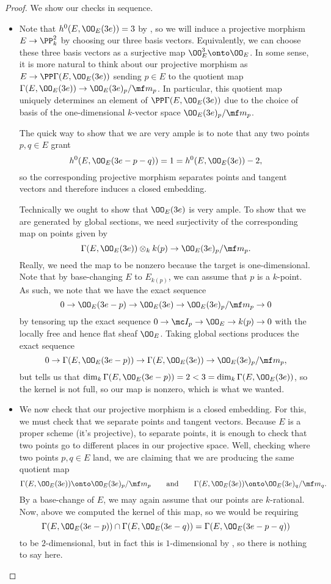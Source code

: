 \documentclass[../notes.tex]{subfiles}
\begin{document}
\begin{proof}
	We show our checks in sequence.
	\begin{itemize}
		\item Note that $h^0(E,\OO_E(3e))=3$ by , so we will induce a projective morphism $E\to\PP^2_k$ by choosing our three basis vectors. Equivalently, we can choose these three basis vectors as a surjective map $\OO_E^3\onto\OO_E$. In some sense, it is more natural to think about our projective morphism as $E\to\PP\Gamma(E,\OO_E(3e))$ sending $p\in E$ to the quotient map $\Gamma(E,\OO_E(3e))\to\OO_E(3e)_p/\mf m_p$. In particular, this quotient map uniquely determines an element of $\PP\Gamma(E,\OO_E(3e))$ due to the choice of basis of the one-dimensional $k$-vector space $\OO_E(3e)_p/\mf m_p$.

		The quick way to show that we are very ample is to note that any two points $p,q\in E$ grant
		\[h^0(E,\OO_E(3e-p-q))=1=h^0(E,\OO_E(3e))-2,\]
		so the corresponding projective morphism separates points and tangent vectors and therefore induces a closed embedding.

		Technically we ought to show that $\OO_E(3e)$ is very ample. To show that we are generated by global sections, we need surjectivity of the corresponding map on points given by
		\[\Gamma(E,\OO_E(3e))\otimes_kk(p)\to\OO_E(3e)_p/\mf m_p.\]
		Really, we need the map to be nonzero because the target is one-dimensional. Note that by base-changing $E$ to $E_{k(p)}$, we can assume that $p$ is a $k$-point. As such, we note that we have the exact sequence
		\[0\to\OO_E(3e-p)\to\OO_E(3e)\to\OO_E(3e)_p/\mf m_p\to0\]
		by tensoring up the exact sequence $0\to\mc I_p\to\OO_E\to k(p)\to0$ with the locally free and hence flat sheaf $\OO_E$. Taking global sections produces the exact sequence
		\[0\to\Gamma(E,\OO_E(3e-p))\to\Gamma(E,\OO_E(3e))\to\OO_E(3e)_p/\mf m_p,\]
		but  tells us that $\dim_k\Gamma(E,\OO_E(3e-p))=2<3=\dim_k\Gamma(E,\OO_E(3e))$, so the kernel is not full, so our map is nonzero, which is what we wanted.

		\item We now check that our projective morphism is a closed embedding. For this, we must check that we separate points and tangent vectors. Because $E$ is a proper scheme (it's projective), to separate points, it is enough to check that two points go to different places in our projective space. Well, checking where two points $p,q\in E$ land, we are claiming that we are producing the same quotient map
		\[\Gamma(E,\OO_E(3e))\onto\OO_E(3e)_p/\mf m_p\qquad\text{and}\qquad\Gamma(E,\OO_E(3e))\onto\OO_E(3e)_q/\mf m_q.\]
		By a base-change of $E$, we may again assume that our points are $k$-rational. Now, above we computed the kernel of this map, so we would be requiring
		\[\Gamma(E,\OO_E(3e-p))\cap\Gamma(E,\OO_E(3e-q))=\Gamma(E,\OO_E(3e-p-q))\]
		to be $2$-dimensional, but in fact this is $1$-dimensional by , so there is nothing to say here.


\end{itemize}
\end{proof}
\end{document}
